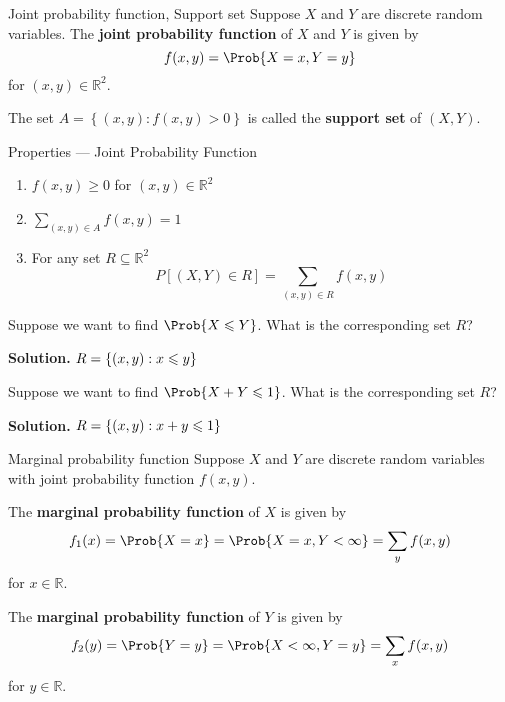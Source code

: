 \begin{Definition}{Joint probability function, Support set}{}
    Suppose $ X $ and $ Y $ are discrete random variables.
    The \textbf{joint probability function} of $ X $ and $ Y $
    is given by
    \[ f(x,y)=\Prob{X=x,Y=y} \]
    for $ (x,y)\in\mathbb{R}^2 $.

    The set $ A=\left\{ (x,y):f(x,y)>0 \right\} $ is called
    the \textbf{support set} of $ (X,Y) $.
\end{Definition}

\begin{Definition}{Properties --- Joint Probability Function}{}
    \begin{enumerate}[label=(\Roman*)]
        \item $ f(x,y)\geqslant 0 $ for $ (x,y)\in\mathbb{R}^2 $
        \item $ \displaystyle \sum\limits_{(x,y)\in A}
                  f(x,y)=1 $
        \item For any set $ R\subseteq \mathbb{R}^2 $
              \[ P\left[ (X,Y)\in R \right]
                  =\sum\limits_{(x,y)\in R}f(x,y)  \]
    \end{enumerate}
\end{Definition}

\begin{Example}{}{}
    Suppose we want to find $ \Prob{X\leqslant Y} $. What is the
    corresponding set $ R $?

    \textbf{Solution.} $ R=\{(x,y):x\leqslant y\} $

    Suppose we want to find $ \Prob{X+Y\leqslant 1} $. What is the corresponding
    set $ R $?

    \textbf{Solution.} $ R=\{(x,y):x+y\leqslant 1\} $
\end{Example}

\begin{Definition}{Marginal probability function}{}
    Suppose $ X $ and $ Y $ are discrete
    random variables with joint probability
    function $ f(x,y) $.

    The \textbf{marginal probability
        function} of $ X $ is given by
    \[ f_1(x)=\Prob{X=x}
        =\Prob{X=x,Y<\infty}
        =\sum\limits_{y}f(x,y)  \]
    for $ x\in\mathbb{R} $.

    The \textbf{marginal probability function} of $ Y $
    is given by
    \[ f_2(y)=\Prob{Y=y}
        =\Prob{X<\infty,Y=y}
        =\sum\limits_{x}f(x,y)  \]
    for $ y\in\mathbb{R} $.
\end{Definition}

